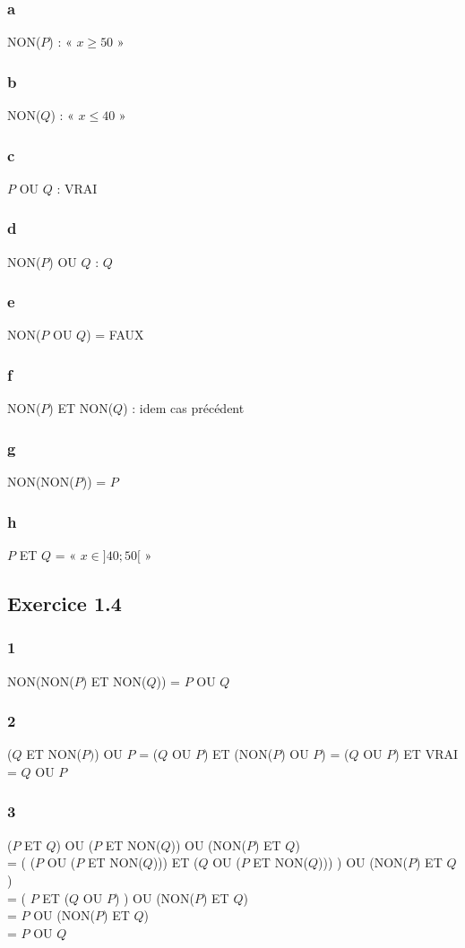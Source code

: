 \documentclass[a4paper,10pt]{report}
\begin{document}
\subsubsection*{a}
NON($P$) : « $x \geq 50$ »
\subsubsection*{b}
NON($Q$) : « $x \leq 40$ »
\subsubsection*{c}
$P$ OU $Q$ : VRAI
\subsubsection*{d}
NON($P$) OU $Q$ : $Q$
\subsubsection*{e}
NON($P$ OU $Q$) = FAUX
\subsubsection*{f}
NON($P$) ET NON($Q$) : idem cas précédent
\subsubsection*{g}
NON(NON($P$)) = $P$
\subsubsection*{h}
$P$ ET $Q$ = « $x \in ]40 ; 50[$ »


\subsection*{Exercice 1.4}
\subsubsection*{1}
NON(NON($P$) ET NON($Q$)) = $P$ OU $Q$
\subsubsection*{2}
($Q$ ET NON($P)$) OU $P$ = ($Q$ OU $P$) ET (NON($P$) OU $P$) = ($Q$ OU $P$) ET VRAI = $Q$ OU $P$
\subsubsection*{3}

($P$ ET $Q$) OU ($P$ ET NON($Q$)) OU (NON($P$) ET $Q$) \\
= ( ($P$ OU ($P$ ET NON($Q$))) ET ($Q$ OU ($P$ ET NON($Q$))) ) OU (NON($P$) ET $Q$) \\
= ( $P$ ET ($Q$ OU $P$) ) OU (NON($P$) ET $Q$)\\
= $P$ OU (NON($P$) ET $Q$) \\
= $P$ OU $Q$
\end{document}
